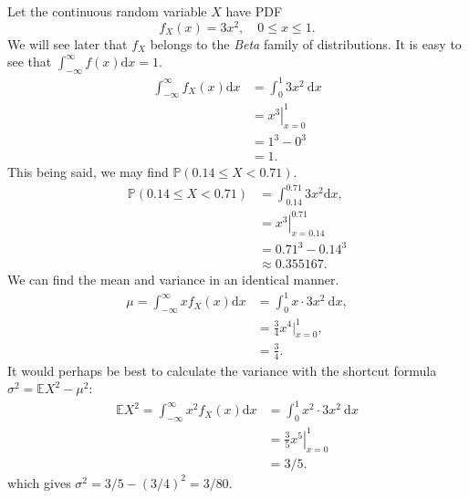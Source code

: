 \documentclass[captions=tableheading]{scrbook}
\begin{document}
\begin{example}

Let the continuous random variable \(X\) have PDF
\[
f_{X}(x)=3x^{2},\quad 0\leq x\leq 1.
\]
We will see later that \(f_{X}\) belongs to the \emph{Beta} family of distributions. It is easy to see that \(\int_{-\infty}^{\infty}f(x)\mathrm{d} x=1\).
\begin{align*}
\int_{-\infty}^{\infty}f_{X}(x)\mathrm{d} x & =\int_{0}^{1}3x^{2}\:\mathrm{d} x\\
 & =\left.x^{3}\right|_{x=0}^{1}\\
 & =1^{3}-0^{3}\\
 & =1.
\end{align*}
This being said, we may find \(\mathbb{P}(0.14\leq X<0.71)\).
\begin{align*}
\mathbb{P}(0.14\leq X<0.71) & =\int_{0.14}^{0.71}3x^{2}\mathrm{d} x,\\
 & =\left.x^{3}\right|_{x=0.14}^{0.71}\\
 & =0.71^{3}-0.14^{3}\\
 & \approx0.355167.
\end{align*}
We can find the mean and variance in an identical manner.
\begin{align*}
\mu=\int_{-\infty}^{\infty}xf_{X}(x)\mathrm{d} x & =\int_{0}^{1}x\cdot3x^{2}\:\mathrm{d} x,\\
 & =\frac{3}{4}x^{4}|_{x=0}^{1},\\
 & =\frac{3}{4}.
\end{align*}
It would perhaps be best to calculate the variance with the shortcut formula \(\sigma^{2}=\mathbb{E} X^{2}-\mu^{2}\):
\begin{align*}
\mathbb{E} X^{2}=\int_{-\infty}^{\infty}x^{2}f_{X}(x)\mathrm{d} x & =\int_{0}^{1}x^{2}\cdot3x^{2}\:\mathrm{d} x\\
 & =\left.\frac{3}{5}x^{5}\right|_{x=0}^{1}\\
 & =3/5.
\end{align*}
which gives \(\sigma^{2}=3/5-(3/4)^{2}=3/80\).
\end{example}
\end{document}
